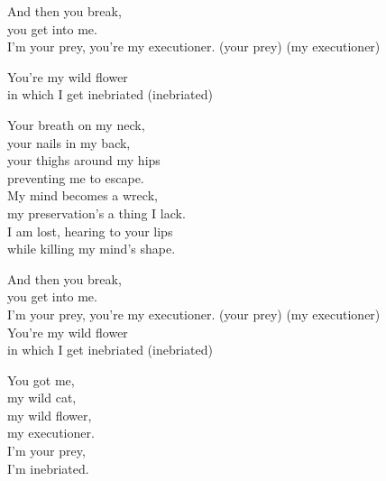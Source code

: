 \begin{lyrics}
And then you break,\\
you get into me.\\
I’m your prey, you’re my executioner.
(your prey)
(my executioner)

You’re my wild flower\\
in which I get inebriated
(inebriated)

Your breath on my neck,\\
your nails in my back,\\
your thighs around my hips\\
preventing me to escape.\\
My mind becomes a wreck,\\
my preservation’s a thing I lack.\\
I am lost, hearing to your lips\\
while killing my mind’s shape.

And then you break,\\
you get into me.\\
I’m your prey, you’re my executioner.
(your prey)
(my executioner)\\
You’re my wild flower\\
in which I get inebriated
(inebriated)

You got me,\\
my wild cat,\\
my wild flower,\\
my executioner.\\
I’m your prey,\\
I’m inebriated.
\end{lyrics}

